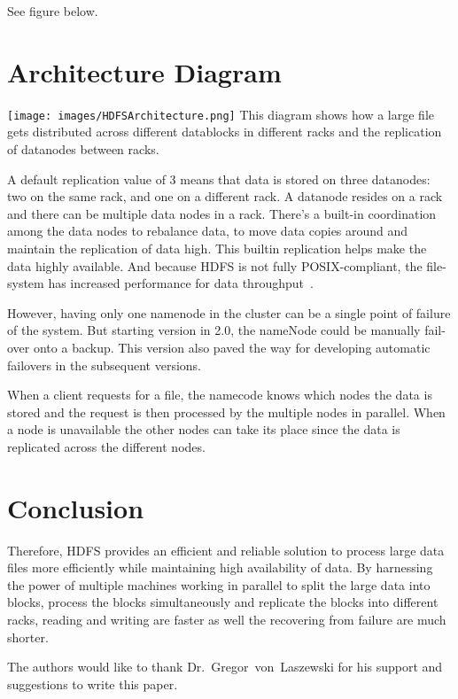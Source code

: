  See figure below.
 
\section{Architecture Diagram} 


\centering\texttt{[image: images/HDFSArchitecture.png]}
This diagram shows how a large file gets distributed across 
different datablocks in different racks and the replication of
datanodes between racks.
 
A default replication value of 3 means that data is stored on three
datanodes: two on the same rack, and one on a different rack. A
datanode resides on a rack and there can be multiple data nodes in a
rack. There’s a built-in coordination among the data nodes to
rebalance data, to move data copies around and maintain the
replication of data high. This builtin replication helps make the
data highly available. And because HDFS is not fully POSIX-compliant,
the file-system has increased performance for data throughput~\cite{hid-sp18-506-hdfs2}.

However, having only one namenode in the cluster can be a single
point of failure of the system. But starting version in 2.0, the
nameNode could be manually fail-over onto a backup. This version
also paved the way for developing automatic failovers in the
subsequent versions.

When a client requests for a file, the namecode knows which nodes the
data is stored and the request is then processed by the multiple
nodes in parallel. When a node is unavailable the other nodes can
take its place since the data is replicated across the different
nodes. 

\section {Conclusion}

Therefore, HDFS provides an efficient and reliable solution to
process large data files more efficiently while maintaining high
availability of data. By harnessing the  power of multiple machines
working in parallel to split the large data into blocks, process the
blocks simultaneously and replicate the blocks into different racks,
reading and writing are faster as well the recovering from failure
are much shorter.

\begin{acks}
  The authors would like to thank Dr.~Gregor~von~Laszewski for his
  support and suggestions to write this paper.
\end{acks}


 
